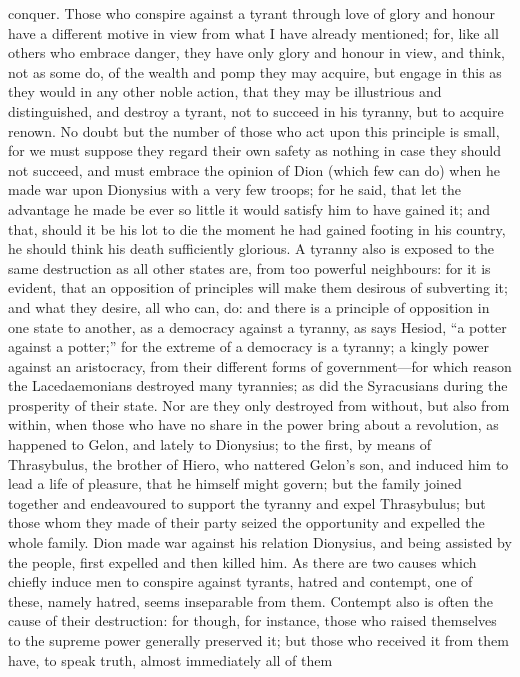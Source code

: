 conquer. Those who conspire against a tyrant through love of glory and
honour have a different motive in view from what I have already mentioned;
for, like all others who embrace danger, they have only glory and honour
in view, and think, not as some do, of the wealth and pomp they may
acquire, but engage in this as they would in any other noble action, that
they may be illustrious and distinguished, and destroy a tyrant, not to
succeed in his tyranny, but to acquire renown. No doubt but the number of
those who act upon this principle is small, for we must suppose they
regard their own safety as nothing in case they should not succeed, and
must embrace the opinion of Dion (which few can do) when he made war upon
Dionysius with a very few troops; for he said, that let the advantage he
made be ever so little it would satisfy him to have gained it; and that,
should it be his lot to die the moment he had gained footing in his
country, he should think his death sufficiently glorious. A tyranny also
is exposed to the same destruction as all other states are, from too
powerful neighbours: for it is evident, that an opposition of principles
will make them desirous of subverting it; and what they desire, all who
can, do: and there is a principle of opposition in one state to another,
as a democracy against a tyranny, as says Hesiod, ``a potter against a
potter;'' for the extreme of a democracy is a tyranny; a kingly power
against an aristocracy, from their different forms of government—for
which reason the Lacedaemonians destroyed many tyrannies; as did the
Syracusians during the prosperity of their state. Nor are they only
destroyed from without, but also from within, when those who have no share
in the power bring about a revolution, as happened to Gelon, and lately to
Dionysius; to the first, by means of Thrasybulus, the brother of Hiero,
who nattered Gelon's son, and induced him to lead a life of pleasure, that
he himself might govern; but the family joined together and endeavoured to
support the tyranny and expel Thrasybulus; but those whom they made of
their party seized the opportunity and expelled the whole family. Dion
made war against his relation Dionysius, and being assisted by the people,
first expelled and then killed him. As there are two causes which chiefly
induce men to conspire against tyrants, hatred and contempt, one of these,
namely hatred, seems inseparable from them. Contempt also is often the
cause of their destruction: for though, for instance, those who raised
themselves to the supreme power generally preserved it; but those who
received it from them have, to speak truth, almost immediately all of them
